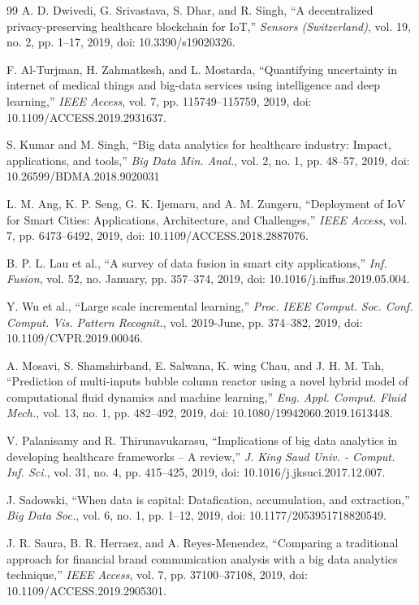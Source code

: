 \documentclass{telkomnika}
\begin{document}
\begin{thebibliography} {99}
 A. D. Dwivedi, G. Srivastava, S. Dhar, and R. Singh, “A decentralized privacy-preserving healthcare blockchain for IoT,” \textsl{Sensors (Switzerland)}, vol. 19, no. 2, pp. 1–17, 2019, doi: 10.3390/s19020326.

 F. Al-Turjman, H. Zahmatkesh, and L. Mostarda, “Quantifying uncertainty in internet of medical things and big-data services using intelligence and deep learning,” \textsl{IEEE Access}, vol. 7, pp. 115749–115759, 2019, doi: 10.1109/ACCESS.2019.2931637.

 S. Kumar and M. Singh, “Big data analytics for healthcare industry: Impact, applications, and tools,” \textsl{Big Data Min. Anal.}, vol. 2, no. 1, pp. 48–57, 2019, doi: 10.26599/BDMA.2018.9020031

 L. M. Ang, K. P. Seng, G. K. Ijemaru, and A. M. Zungeru, “Deployment of IoV for Smart Cities: Applications, Architecture, and Challenges,” \textsl{IEEE Access}, vol. 7, pp. 6473–6492, 2019, doi: 10.1109/ACCESS.2018.2887076.

 B. P. L. Lau et al., “A survey of data fusion in smart city applications,” \textsl{Inf. Fusion}, vol. 52, no. January, pp. 357–374, 2019, doi: 10.1016/j.inffus.2019.05.004.

 Y. Wu et al., “Large scale incremental learning,” \textsl{Proc. IEEE Comput. Soc. Conf. Comput. Vis. Pattern Recognit.}, vol. 2019-June, pp. 374–382, 2019, doi: 10.1109/CVPR.2019.00046.

 A. Mosavi, S. Shamshirband, E. Salwana, K. wing Chau, and J. H. M. Tah, “Prediction of multi-inputs bubble column reactor using a novel hybrid model of computational fluid dynamics and machine learning,” \textsl{Eng. Appl. Comput. Fluid Mech.}, vol. 13, no. 1, pp. 482–492, 2019, doi: 10.1080/19942060.2019.1613448.

 V. Palanisamy and R. Thirunavukarasu, “Implications of big data analytics in developing healthcare frameworks – A review,” \textsl{J. King Saud Univ. - Comput. Inf. Sci.}, vol. 31, no. 4, pp. 415–425, 2019, doi: 10.1016/j.jksuci.2017.12.007.

 J. Sadowski, “When data is capital: Datafication, accumulation, and extraction,” \textsl{Big Data Soc.}, vol. 6, no. 1, pp. 1–12, 2019, doi: 10.1177/2053951718820549.

 J. R. Saura, B. R. Herraez, and A. Reyes-Menendez, “Comparing a traditional approach for financial brand communication analysis with a big data analytics technique,” \textsl{IEEE Access}, vol. 7, pp. 37100–37108, 2019, doi: 10.1109/ACCESS.2019.2905301.


\end{thebibliography}
\end{document}
